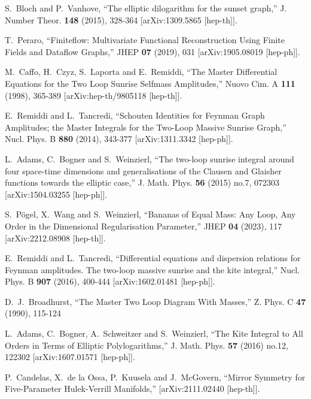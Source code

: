 \documentclass[a4paper,12pt]{article}
\numberwithin{equation}{section}
\numberwithin{figure}{section}
\begin{document}
\begin{thebibliography}{99}
S.~Bloch and P.~Vanhove,
``The elliptic dilogarithm for the sunset graph,''
J. Number Theor. \textbf{148} (2015), 328-364
[arXiv:1309.5865 [hep-th]].
  
T.~Peraro,
``Finiteflow: Multivariate Functional Reconstruction Using Finite Fields and Dataflow Graphs,''
JHEP \textbf{07} (2019), 031
[arXiv:1905.08019 [hep-ph]].
  
M.~Caffo, H.~Czyz, S.~Laporta and E.~Remiddi,
``The Master Differential Equations for the Two Loop Sunrise Selfmass Amplitudes,''
Nuovo Cim. A \textbf{111} (1998), 365-389
[arXiv:hep-th/9805118 [hep-th]].
  
E.~Remiddi and L.~Tancredi,
``Schouten Identities for Feynman Graph Amplitudes; the Master Integrals for the Two-Loop Massive Sunrise Graph,''
Nucl. Phys. B \textbf{880} (2014), 343-377
[arXiv:1311.3342 [hep-ph]].
  
L.~Adams, C.~Bogner and S.~Weinzierl,
``The two-loop sunrise integral around four space-time dimensions and generalisations of the Clausen and Glaisher functions towards the elliptic case,''
J. Math. Phys. \textbf{56} (2015) no.7, 072303
[arXiv:1504.03255 [hep-ph]].

S.~P\"ogel, X.~Wang and S.~Weinzierl,
``Bananas of Equal Mass: Any Loop, Any Order in the Dimensional Regularisation Parameter,''
JHEP \textbf{04} (2023), 117
[arXiv:2212.08908 [hep-th]].

 

E.~Remiddi and L.~Tancredi,
``Differential equations and dispersion relations for Feynman amplitudes. The two-loop massive sunrise and the kite integral,''
Nucl. Phys. B \textbf{907} (2016), 400-444
[arXiv:1602.01481 [hep-ph]].


D.~J.~Broadhurst,
``The Master Two Loop Diagram With Masses,''
Z. Phys. C \textbf{47} (1990), 115-124
  
L.~Adams, C.~Bogner, A.~Schweitzer and S.~Weinzierl,
``The Kite Integral to All Orders in Terms of Elliptic Polylogarithms,''
J. Math. Phys. \textbf{57} (2016) no.12, 122302
[arXiv:1607.01571 [hep-ph]].

P.~Candelas, X.~de la Ossa, P.~Kuusela and J.~McGovern,
``Mirror Symmetry for Five-Parameter Hulek-Verrill Manifolds,''
[arXiv:2111.02440 [hep-th]].


\end{thebibliography}
\end{document}
